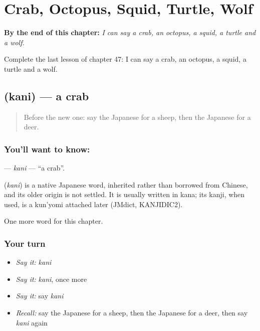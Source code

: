 
\chapter{Crab, Octopus, Squid, Turtle, Wolf}
\label{ch:ja-crab-octopus-squid-turtle-wolf}

\begin{chapteropening}
\textbf{By the end of this chapter:} \emph{I can say a crab, an octopus, a squid, a turtle and a wolf.}

Complete the last lesson of chapter 47: I can say a crab, an octopus, a squid, a turtle and a wolf.
\end{chapteropening}

\section[\texorpdfstring{\ja{かに} (kani)}{かに (kani)}]{ (kani) — a crab}

\label{lesson:JA-C47-kani}



\begin{quote}
Before the new one: say the Japanese for a sheep, then the Japanese for a deer.
\end{quote}

\subsection*{You'll want to know: }
\textbf{} — \emph{kani} — \textquotedblleft{}a crab\textquotedblright{}.

\begin{cousinweb}
\textbf{} (\emph{kani}) is a native Japanese word, inherited rather than borrowed from Chinese, and its older origin is not settled. It is usually written in kana; its kanji, when used, is a kun'yomi attached later (JMdict, KANJIDIC2).
\end{cousinweb}

\begin{grammarlens}[title={What you've built}]
One more word for this chapter.
\end{grammarlens}

\subsection*{Your turn}
\begin{itemize}
\raggedright
  \item \emph{Say it:} \emph{kani}
  \item \emph{Say it:} \emph{kani}, once more
  \item \emph{Say it:} say \emph{kani}
  \item \emph{Recall:} say the Japanese for a sheep, then the Japanese for a deer, then say \emph{kani} again
\end{itemize}

